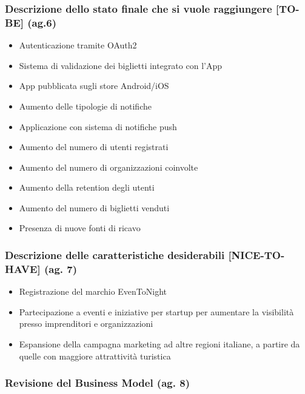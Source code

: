 \documentclass[11pt,a4paper]{article}
\providecommand{\tightlist}{\setlength{\itemsep}{0pt}\setlength{\parskip}{0pt}}
\begin{document}
\subsubsection{\texorpdfstring{{Descrizione dello stato finale che si vuole raggiungere {[}TO-BE{]} (ag.6)}}{Descrizione dello stato finale che si vuole raggiungere {[}TO-BE{]} (ag.6)}}\label{h.6zws62i5chql}

\begin{itemize}
\tightlist
\item
  {Autenticazione tramite OAuth2}
\item
  {Sistema di validazione dei biglietti integrato con l’App}
\item
  {App pubblicata sugli store Android/iOS}
\item
  {Aumento delle tipologie di notifiche}
\item
  {Applicazione con sistema di notifiche push }
\item
  {Aumento del numero di utenti registrati}
\item
  {Aumento del numero di organizzazioni coinvolte}
\item
  {Aumento della retention degli utenti}
\item
  {Aumento del numero di biglietti venduti}
\item
  {Presenza di nuove fonti di ricavo}
\end{itemize}

{}

\subsubsection{\texorpdfstring{{Descrizione delle caratteristiche desiderabili {[}NICE-TO-HAVE{]} (ag. 7)}}{Descrizione delle caratteristiche desiderabili {[}NICE-TO-HAVE{]} (ag. 7)}}\label{h.x05f3pi4qn4r}

\begin{itemize}
\tightlist
\item
  {R}{egistrazione del marchio EvenToNight}
\item
  {Partecipazione a eventi e iniziative per startup per aumentare la visibilità presso imprenditori e organizzazioni}
\item
  {Espansione della campagna marketing ad altre regioni italiane, a partire da quelle con maggiore attrattività turistica}
\end{itemize}

\subsubsection{\texorpdfstring{{Revisione del Business Model (ag. 8)}}{Revisione del Business Model (ag. 8)}}\label{h.xaxa9fyx61hd}
\end{document}
